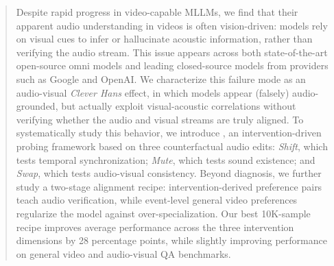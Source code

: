 \vspace{-1.5em}
\begin{abstract}

Despite rapid progress in video-capable MLLMs, we find that their apparent audio understanding in videos is often vision-driven: models rely on visual cues to infer or hallucinate acoustic information, rather than verifying the audio stream. This issue appears across both state-of-the-art open-source omni models and leading closed-source models from providers such as Google and OpenAI. We characterize this failure mode as an audio-visual \textit{Clever Hans} effect, in which models appear (falsely) audio-grounded, but actually exploit visual-acoustic correlations without verifying whether the audio and visual streams are truly aligned.
To systematically study this behavior, we introduce \Thud, an intervention-driven probing framework based on three counterfactual audio edits: \textit{Shift}, which tests temporal synchronization; \textit{Mute}, which tests sound existence; and \textit{Swap}, which tests audio-visual consistency. Beyond diagnosis, we further study a two-stage alignment recipe: intervention-derived preference pairs teach audio verification, while event-level general video preferences regularize the model against over-specialization. Our best 10K-sample recipe improves average performance across the three intervention dimensions by 28 percentage points, while slightly improving performance on general video and audio-visual QA benchmarks.



\end{abstract}